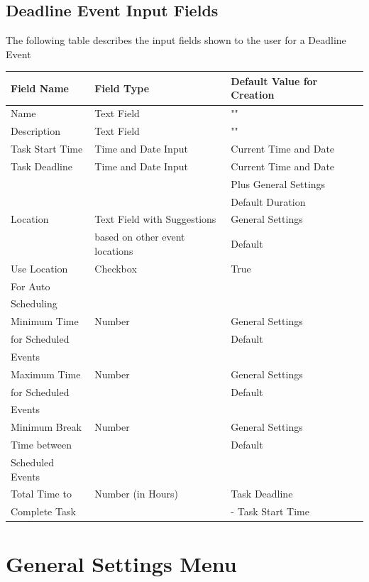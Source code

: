 \documentclass{scrreprt}
\begin{document}
\subsection{Deadline Event Input Fields}
The following table describes the input fields shown to the user for a Deadline Event

\begin{center}
\begin{longtable}{ | p{3cm} | p{8cm} | p{4cm} | }
\hline
\textbf{Field Name} & \textbf{Field Type} & \textbf{Default Value for Creation} \\
\hline
Name & Text Field & "" \\
\hline
Description & Text Field & "" \\
\hline
Task Start Time & Time and Date Input & Current Time and Date \\
\hline
Task Deadline & Time and Date Input & Current Time and Date \\
& & Plus General Settings \\
& & Default Duration \\
\hline
Location & Text Field with Suggestions & General Settings \\
& based on other event locations & Default \\
\hline
Use Location & Checkbox & True \\
For Auto & & \\
Scheduling & & \\
\hline
Minimum Time & Number & General Settings \\
for Scheduled & & Default\\
Events & & \\
\hline
Maximum Time & Number & General Settings \\
for Scheduled & & Default\\
Events & & \\
\hline
Minimum Break & Number & General Settings \\
Time between & & Default\\
 Scheduled Events & & \\
\hline
Total Time to & Number (in Hours) & Task Deadline \\
Complete Task & & - Task Start Time \\
\hline
\end{longtable}
\end{center}

\section{General Settings Menu}
\end{document}
